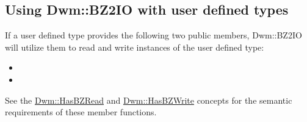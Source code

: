 \begin{minipage}{\textwidth}
\subsection{Using {\ttfamily Dwm::BZ2IO} with user defined types}
If a user defined type provides the following two public members,
{\ttfamily Dwm::BZ2IO} will utilize them to read and write
instances of the user defined type:
\vspace{1ex}

\begin{itemize}[noitemsep,nolistsep]
\item[] 
\item[] 
\end{itemize}
\vspace{1ex}

See the \hyperlink{concept:HasBZRead}{\ttfamily Dwm::HasBZRead}
and \hyperlink{concept:HasBZWrite}{\ttfamily Dwm::HasBZWrite}
concepts for the semantic requirements of these member functions.
\end{minipage}

